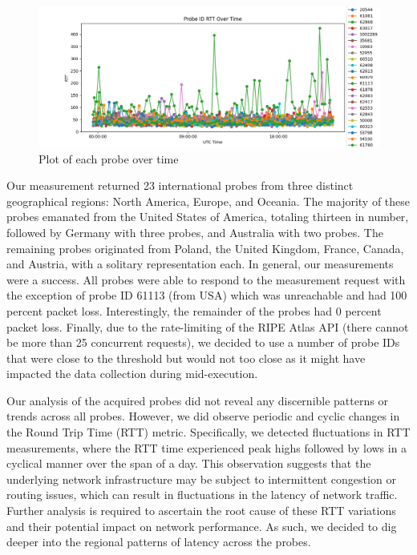 \documentclass[acmsmall]{acmart}
\begin{document}
\begin{figure}
    \centering
    \includegraphics[scale=0.4]{graphs/general.png}
    \caption{Plot of each probe over time}
    \label{fig:general}
\end{figure}%

Our measurement returned 23 international probes from three distinct geographical regions: North America, Europe, and Oceania. The majority of these probes emanated from the United States of America, totaling thirteen in number, followed by Germany with three probes, and Australia with two probes. The remaining probes originated from Poland, the United Kingdom, France, Canada, and Austria, with a solitary representation each. In general, our measurements were a success. All probes were able to respond to the measurement request with the exception of probe ID 61113 (from USA) which was unreachable and had 100 percent packet loss. Interestingly, the remainder of the probes had 0 percent packet loss. Finally, due to the rate-limiting of the RIPE Atlas API (there cannot be more than 25 concurrent requests), we decided to use a number of probe IDs that were close to the threshold but would not too close as it might have impacted the data collection during mid-execution.  

Our analysis of the acquired probes did not reveal any discernible patterns or trends across all probes. However, we did observe periodic and cyclic changes in the Round Trip Time (RTT) metric. Specifically, we detected fluctuations in RTT measurements, where the RTT time experienced peak highs followed by lows in a cyclical manner over the span of a day. This observation suggests that the underlying network infrastructure may be subject to intermittent congestion or routing issues, which can result in fluctuations in the latency of network traffic. Further analysis is required to ascertain the root cause of these RTT variations and their potential impact on network performance. As such, we decided to dig deeper into the regional patterns of latency across the probes. 
\end{document}
